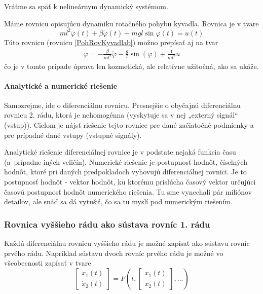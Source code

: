 \documentclass[a4paper, 10pt, ]{article}
\begin{document}
Vráťme sa späť k nelineárnym dynamický systémom.


Máme rovnicu opisujúcu dynamiku rotačného pohybu kyvadla. Rovnica je v tvare
\begin{equation}
    ml^2 \ddot{\varphi}(t) + \beta \dot{\varphi}(t) + mgl\sin{\varphi(t)} = u(t)
\end{equation}
Túto rovnicu (rovnicu \eqref{PohRovKyvadlab}) možno prepísať aj na tvar
\begin{align}
	\ddot{\varphi} = - \frac{\beta}{ml^2} \dot{\varphi} - \frac{g}{l} \sin(\varphi) + \frac{1}{ml^2}u
\end{align}
čo je v tomto prípade úprava len kozmetická, ale relatívne užitočná, ako sa ukáže.


\paragraph{Analytické a numerické riešenie}

Samozrejme, ide o diferenciálnu rovnicu. Presnejšie o obyčajnú diferenciálnu rovnicu 2. rádu, ktorá je nehomogénna (vyskytuje sa v nej „externý signál“ (vstup)). Cieľom je nájsť riešenie tejto rovnice pre dané začiatočné podmienky a pre prípadné dané vstupy (vstupné signály).

Analytické riešenie diferenciálnej rovnice je v podstate nejaká funkcia času (a~prípadne iných veličín). Numerické riešenie je postupnosť hodnôt, číselných hodnôt, ktoré pri daných predpokladoch vyhovujú diferenciálnej rovnici. Je to postupnosť hodnôt - vektor hodnôt, ku ktorému prislúcha časový vektor určujúci časovú postupnosť hodnôt numerického riešenia. Tu sme vynechali pár miliónov detailov, ale snáď sa dá vytušiť, čo sa tu myslí pod numerickým riešením.




\subsubsection{Rovnica vyššieho rádu ako sústava rovníc 1. rádu}
\label{RVRASR1R}

Každú diferenciálnu rovnicu vyššieho rádu je možné zapísať ako sústavu rovníc prvého rádu. Napríklad sústavu dvoch rovníc prvého rádu je možné vo všeobecnosti zapísať v tvare
\begin{equation} \label{naznak01}
   \begin{bmatrix} \dot x_1(t) \\ \dot x_2(t) \end{bmatrix} = F \left( t, \begin{bmatrix} x_1(t) \\ x_2(t) \end{bmatrix}, \ldots \right)
\end{equation}
\end{document}
